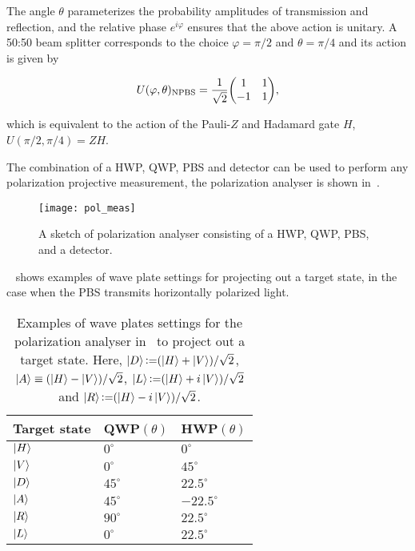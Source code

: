 \noindent
The angle $\theta$ parameterizes the probability amplitudes of transmission and reflection, and the relative phase $e^{i\varphi}$ ensures that the above action is unitary. A 50:50 beam splitter corresponds to the choice $\varphi = \pi/2$ and $\theta= \pi/4$ and its action is given by

\begin{align}
	U(\varphi, \theta)_\text{NPBS} = \frac{1}{\sqrt{2}}\mqty(1 & 1 \\ -1 & 1),
\end{align}

\noindent
which is equivalent to the action of the Pauli-$Z$ and Hadamard gate $H$, $U(\pi/2, \pi/4) = ZH$.

\clearpage
\noindent
The combination of a \acs{HWP}, \acs{QWP}, \acs{PBS} and detector can be used to perform any polarization projective measurement, the polarization analyser is shown in~.

\begin{figure}
	\centering
	\texttt{[image: pol\_meas]}
	\caption[A sketch of a polarization analyser consisting of a \acs{HWP}, \acs{QWP}, \acs{PBS}, and a single photon detector.]{A sketch of polarization analyser consisting of a \acs{HWP}, \acs{QWP}, \acs{PBS}, and a detector.}
\end{figure}

\noindent
~ shows examples of wave plate settings for projecting out a target state, in the case when the \acs{PBS} transmits horizontally polarized light.

\begin{table}
	\centering
	\caption[Examples of wave plates settings for the polarization analyser in~\protect{} to project out a target state.]{Examples of wave plates settings for the polarization analyser in~\protect{} to project out a target state. Here, ${\ket{D}\operatorname{\vcentcolon=}(\ket{H}+\ket{V})/\sqrt{2}}$, ${\ket{A}\equiv(\ket{H} - \ket{V})/\sqrt{2}}$, ${\ket{L}\operatorname{\vcentcolon=}(\ket{H}+i\ket{V})/\sqrt{2}}$ and ${\ket{R}\operatorname{\vcentcolon=}(\ket{H}-i\ket{V})/\sqrt{2}}$.}

	\begin{tabular}{lll}
		\toprule
		Target state & QWP$(\theta)$ & HWP$(\theta)$ \\
		\toprule
		$\ket{H}$  & $0^{\circ}$   & $0^{\circ}$ \\
		$\ket{V}$  & $0^{\circ}$   & $45^{\circ}$ \\ 
		$\ket{D}$  & $45^{\circ}$  & $22.5^{\circ}$ \\
		$\ket{A}$  & $45^{\circ}$  & $-22.5^{\circ}$ \\
		$\ket{R}$  & $90^{\circ}$  & $22.5^{\circ}$ \\
		$\ket{L}$  & $0^{\circ}$   & $22.5^{\circ}$ \\
		\toprule
	\end{tabular}
\end{table}
